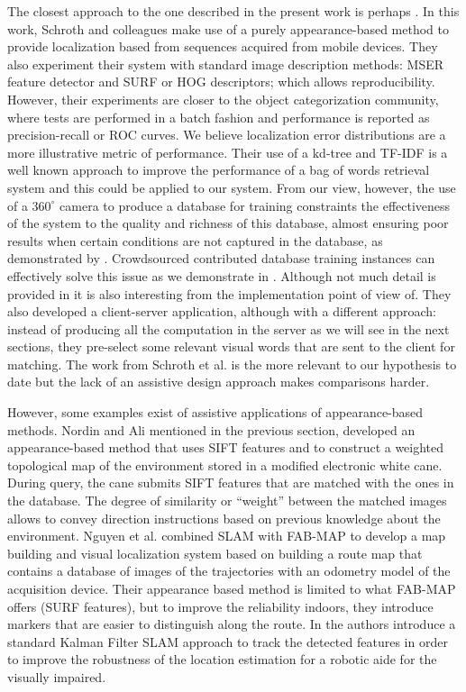 The closest approach to the one described in the present work is perhaps \cite{schroth2011mobile}. In this work, Schroth and colleagues make use of a purely appearance-based method to provide localization based from sequences acquired from mobile devices. They also experiment their system with standard image description methods: MSER feature detector and SURF or HOG descriptors; which allows reproducibility. However, their experiments are closer to the object categorization community, where tests are performed in a batch fashion and performance is reported as precision-recall or ROC curves. We believe localization error distributions are a more illustrative metric of performance. Their use of a kd-tree and TF-IDF is a well known approach to improve the performance of a bag of words retrieval system and this could be applied to our system. From our view, however, the use of a $360^{\circ}$ camera to produce a database for training constraints the effectiveness of the system to the quality and richness of this database, almost ensuring poor results when certain conditions are not captured in the database, as demonstrated by \cite{milford2012seqslam}. Crowdsourced contributed database training instances can effectively solve this issue as we demonstrate in \cite{RiveraWearable}. Although not much detail is provided in \cite{schroth2011mobile} it is also interesting from the implementation point of view of. They also developed a client-server application, although with a different approach: instead of producing all the computation in the server as we will see in the next sections, they pre-select some relevant visual words that are sent to the client for matching. The work from Schroth et al. is the more relevant to our hypothesis to date but the lack of an assistive design approach makes comparisons harder.

However, some examples exist of assistive applications of appearance-based methods. Nordin and Ali mentioned in the previous section, developed an appearance-based method that uses SIFT features and to construct a weighted topological map of the environment stored in a modified electronic white cane. During query, the cane submits SIFT features that are matched with the ones in the database. The degree of similarity or ``weight'' between the matched images allows to convey direction instructions based on previous knowledge about the environment. Nguyen et al. \cite{nguyen2014mapping} combined SLAM with FAB-MAP to develop a map building and visual localization system based on building a route map that contains a database of images of the trajectories with an odometry model of the acquisition device. Their appearance based method is limited to what FAB-MAP offers (SURF features), but to improve the reliability indoors, they introduce markers that are easier to distinguish along the route. In \cite{nguyen2014visual} the authors introduce a standard Kalman Filter  SLAM approach to track the detected features in order to improve the robustness of the location estimation for a robotic aide for the visually impaired.

